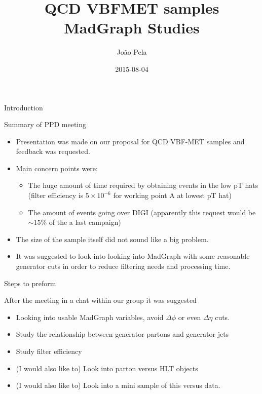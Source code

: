 \documentclass[8pt]{beamer}
\author[J. Pela]{João Pela}
\title{QCD VBFMET samples MadGraph Studies}
\institute[ICL]{Imperial College London}
\date{2015-08-04}
\begin{document}
\setlength{\unitlength}{1mm}

\begin{frame}
  \titlepage
\end{frame}

\begin{frame}{Introduction}

\begin{block}{Summary of PPD meeting}
  
\begin{itemize}
  \item Presentation was made on our proposal for QCD VBF-MET samples and feedback was requested.
  \item Main concern points were:
  \begin{itemize}
    \item The huge amount of time required by obtaining events in the low pT hats (filter efficiency is  $5 \times 10^{-6}$ for working point A at lowest pT hat) 
    \item The amount of events going over DIGI (apparently this request would be $\sim15\%$ of the a last campaign)
  \end{itemize}
  \item The size of the sample itself did not sound like a big problem.
  \item It was suggested to look into looking into MadGraph with some reasonable generator cuts in order to reduce filtering needs and processing time. 
\end{itemize}

\end{block}

\begin{block}{Steps to preform}

After the meeting in a chat within our group it was suggested 

\begin{itemize}
  \item Looking into usable MadGraph variables, avoid $\Delta\phi$ or even $\Delta\eta$ cuts.
  \item Study the relationship between generator partons and generator jets
  \item Study filter efficiency
  \item (I would also like to) Look into parton versus HLT objects
  \item (I would also like to) Look into a mini sample of this versus data. 
\end{itemize}

\end{block}

\end{frame}
\end{document}
